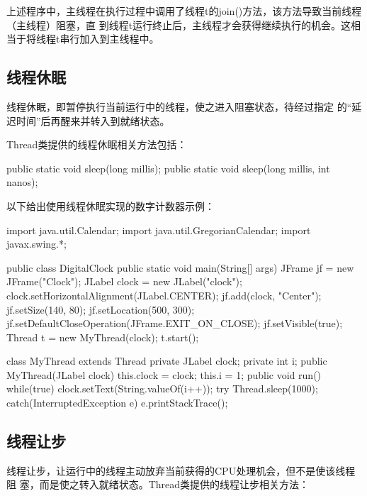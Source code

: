 
上述程序中，主线程在执行过程中调用了线程t的join()方法，该方法导致当前线程（主线程）阻塞，直
到线程t运行终止后，主线程才会获得继续执行的机会。这相当于将线程t串行加入到主线程中。

\subsection{线程休眠}

线程休眠，即暂停执行当前运行中的线程，使之进入阻塞状态，待经过指定
的“延迟时间”后再醒来并转入到就绪状态。

Thread类提供的线程休眠相关方法包括：

\begin{javaCode}
public static void sleep(long millis);
public static void sleep(long millis, int nanos);
\end{javaCode}

以下给出使用线程休眠实现的数字计数器示例：


\begin{javaCode}
import java.util.Calendar;
import java.util.GregorianCalendar;
import javax.swing.*;

public class DigitalClock {
  public static void main(String[] args) {
    JFrame jf = new JFrame("Clock");
    JLabel clock = new JLabel("clock");
    clock.setHorizontalAlignment(JLabel.CENTER);
    jf.add(clock, "Center");
    jf.setSize(140, 80);
    jf.setLocation(500, 300);
    jf.setDefaultCloseOperation(JFrame.EXIT_ON_CLOSE);
    jf.setVisible(true);
    Thread t = new MyThread(clock);
    t.start();
  }
}

class MyThread extends Thread {
  private JLabel clock;
  private int i;
  public MyThread(JLabel clock) {
    this.clock = clock;
    this.i = 1;
  }
  public void run() {
    while(true) {
      clock.setText(String.valueOf(i++));
      try {
        Thread.sleep(1000);
      } catch(InterruptedException e) {
        e.printStackTrace();
      }
    }
  }
}  
\end{javaCode}

\subsection{线程让步}

线程让步，让运行中的线程主动放弃当前获得的CPU处理机会，但不是使该线程阻
塞，而是使之转入就绪状态。Thread类提供的线程让步相关方法：

